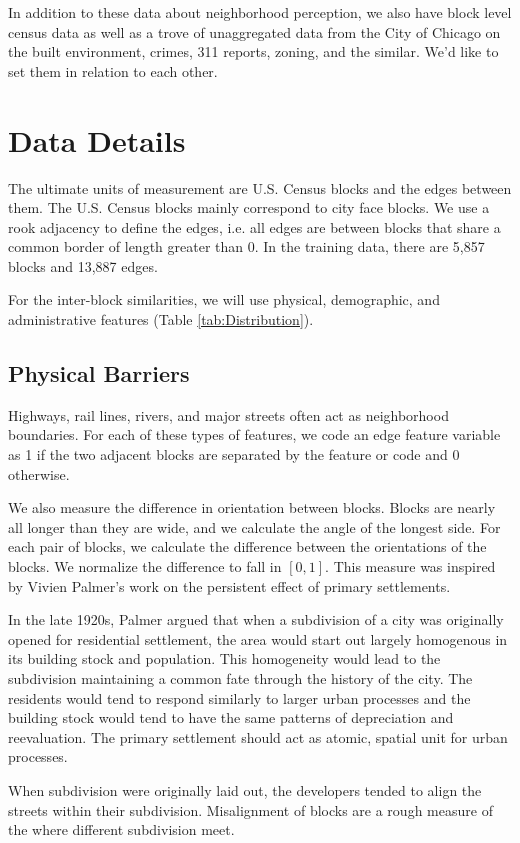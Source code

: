 \documentclass[12pt,letter]{article}\usepackage[]{graphicx}\usepackage[]{color}
\let\cite=\citep
\begin{document}
In addition to these data about neighborhood perception, we also have
block level census data as well as a trove of unaggregated data from
the City of Chicago on the built environment, crimes, 311 reports,
zoning, and the similar. We'd like to set them in relation to each
other.

\section*{Data Details}
The ultimate units of measurement are U.S. Census blocks and the edges
between them. The U.S. Census blocks mainly correspond to city face blocks.
We use a rook adjacency to define the edges, i.e. all edges are between blocks
that share a common border of length greater than 0. In the training data,
there are 5,857 blocks and
  13,887 edges.

For the inter-block similarities, we will use physical, demographic, and
administrative features (Table \ref{tab:Distribution}).

\subsection*{Physical Barriers}
Highways, rail lines, rivers, and major streets often act as neighborhood
boundaries. For each of these types of features, we code an edge feature
variable as 1 if the two adjacent blocks are separated by the feature or code
and 0 otherwise.

We also measure the difference in orientation between blocks. Blocks
are nearly all longer than they are wide, and we calculate the angle
of the longest side. For each pair of blocks, we calculate the
difference between the orientations of the blocks. We normalize the
difference to fall in $[0, 1]$. This measure was inspired by Vivien
Palmer's work on the persistent effect of primary settlements. 

In the late 1920s, Palmer argued that when a subdivision
of a city was originally opened for residential settlement, the
area would start out largely homogenous in its building stock
and population. This homogeneity would lead to the subdivision
maintaining a common fate through the history of the city. The
residents would tend to respond similarly to larger urban processes
and the building stock would tend to have the same patterns of
depreciation and reevaluation. The primary settlement should act as
atomic, spatial unit for urban processes.\cite{palmer_primary_1932}

When subdivision were originally laid out, the developers tended to
align the streets within their subdivision. Misalignment of blocks are
a rough measure of the where different subdivision meet. 
\end{document}
